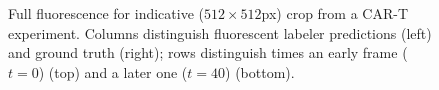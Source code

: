 \begin{figure}%
    \centering
    \qquad
    \qquad
    \qquad
\caption{Full fluorescence for indicative ($512 \times 512$px) crop from a CAR-T experiment. Columns distinguish fluorescent labeler predictions (left) and ground truth (right); rows distinguish times an early frame ($t=0$) (top) and a later one ($t=40$) (bottom).}
\label{fig:full_colour_t_cells}
\end{figure}

